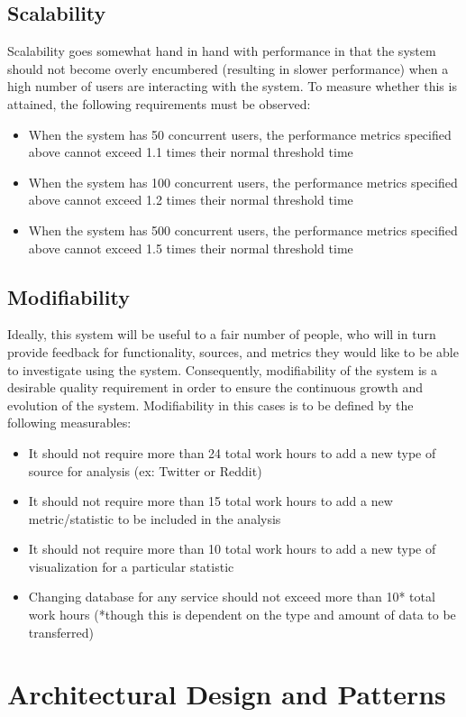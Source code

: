 \documentclass[12pt]{article}
\begin{document}
\subsection{Scalability}
Scalability goes somewhat hand in hand with performance in that the system should not become overly encumbered (resulting in slower performance) when a high number of users are interacting with the system. To measure whether this is attained, the following requirements must be observed:
\begin{itemize}
    \item When the system has 50 concurrent users, the performance metrics specified above cannot exceed 1.1 times their normal threshold time
    \item When the system has 100 concurrent users, the performance metrics specified above cannot exceed 1.2 times their normal threshold time
    \item When the system has 500 concurrent users, the performance metrics specified above cannot exceed 1.5 times their normal threshold time
\end{itemize}
\subsection{Modifiability}
Ideally, this system will be useful to a fair number of people, who will in turn provide feedback for functionality, sources, and metrics they would like to be able to investigate using the system. Consequently, modifiability of the system is a desirable quality requirement in order to ensure the continuous growth and evolution of the system. Modifiability in this cases is to be defined by the following measurables:
\begin{itemize}
    \item It should not require more than 24 total work hours to add a new type of source for analysis (ex: Twitter or Reddit)
    \item It should not require more than 15 total work hours to add a new metric/statistic to be included in the analysis
    \item It should not require more than 10 total work hours to add a new type of visualization for a particular statistic
    \item Changing database for any service should not exceed more than 10* total work hours (*though this is dependent on the type and amount of data to be transferred)
\end{itemize}

\section{Architectural Design and Patterns}
\end{document}
